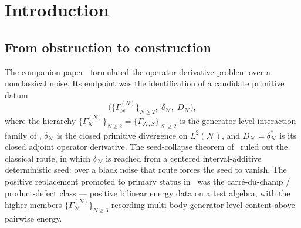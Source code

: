 \documentclass[11pt,reqno]{amsart}
\theoremstyle{plain}
\theoremstyle{definition}
\theoremstyle{remark}
\newcommand{\cA}{\mathcal A}
\newcommand{\cN}{\mathcal N}
\newcommand{\dN}{D_{\cN}}
\newcommand{\divN}{\delta_{\cN}}
\begin{document}
\begin{abstract}
We do not claim a universal construction over every black noise.
We claim that for every compatible matrix-positive, weighted-matrix-positive, form-closable
$\Gamma$-seed on $\cA$, the construction yields $(\dN,\divN)$.
The open problem for black noise becomes: construct such a
$\Gamma$-seed from the noise algebra of $\cN$.
\end{abstract}

\maketitle

\section{Introduction}\label{sec:intro}

\subsection{From obstruction to construction}\label{sec:intro-from}

The companion paper~\cite{PrimitiveDivergence} formulated the
operator-derivative problem over a nonclassical noise. Its endpoint
was the identification of a candidate primitive datum
\begin{equation}\label{eq:primitive-tuple}
  \bigl(\{\Gamma_{\cN}^{(N)}\}_{N\ge 2},\;\divN,\;\dN\bigr),
\end{equation}
where the hierarchy
$\{\Gamma_{\cN}^{(N)}\}_{N\ge 2}=\{\Gamma_{\cN,S}\}_{|S|\ge 2}$ is
the generator-level interaction family of
\cite[Def.~6.10]{PrimitiveDivergence}, $\divN$ is the closed
primitive divergence on $L^{2}(\cN)$, and $\dN=\divN^{*}$ is its
closed adjoint operator derivative. The seed-collapse theorem
of~\cite[\S 5]{PrimitiveDivergence} ruled out the classical route,
in which $\divN$ is reached from a centered interval-additive
deterministic seed: over a black noise that route forces the seed
to vanish. The positive replacement promoted to primary status
in~\cite[\S 5.4]{PrimitiveDivergence} was the carr\'e-du-champ /
product-defect class --- positive bilinear energy data on a test
algebra, with the higher members
$\{\Gamma_{\cN}^{(N)}\}_{N\ge 3}$ recording multi-body
generator-level content above pairwise energy.
\end{document}
